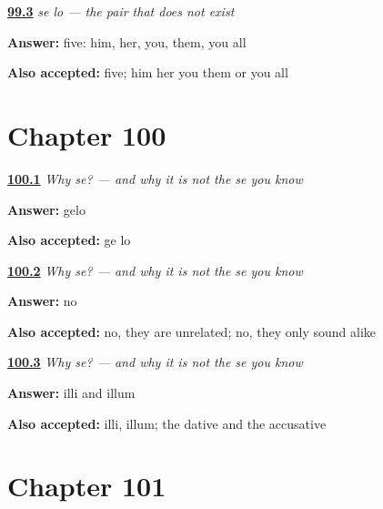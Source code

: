 \noindent\begin{minipage}[t]{\linewidth}
\raggedright
\hyperlink{review-ES-C47-se-lo-ambiguous}{\textbf{99.3}} \emph{se lo — the pair that does not exist}\par
\small \textbf{Answer:} five: him, her, you, them, you all\par
\footnotesize \textbf{Also accepted:} five; him her you them or you all
\end{minipage}\par\medskip

\section*{Chapter 100}

\noindent\begin{minipage}[t]{\linewidth}
\raggedright
\hyperlink{review-ES-C47-por-que-se-old}{\textbf{100.1}} \emph{Why se? — and why it is not the se you know}\par
\small \textbf{Answer:} gelo\par
\footnotesize \textbf{Also accepted:} ge lo
\end{minipage}\par\medskip

\noindent\begin{minipage}[t]{\linewidth}
\raggedright
\hyperlink{review-ES-C47-por-que-se-two}{\textbf{100.2}} \emph{Why se? — and why it is not the se you know}\par
\small \textbf{Answer:} no\par
\footnotesize \textbf{Also accepted:} no, they are unrelated; no, they only sound alike
\end{minipage}\par\medskip

\noindent\begin{minipage}[t]{\linewidth}
\raggedright
\hyperlink{review-ES-C47-por-que-se-why}{\textbf{100.3}} \emph{Why se? — and why it is not the se you know}\par
\small \textbf{Answer:} illi and illum\par
\footnotesize \textbf{Also accepted:} illi, illum; the dative and the accusative
\end{minipage}\par\medskip

\section*{Chapter 101}

